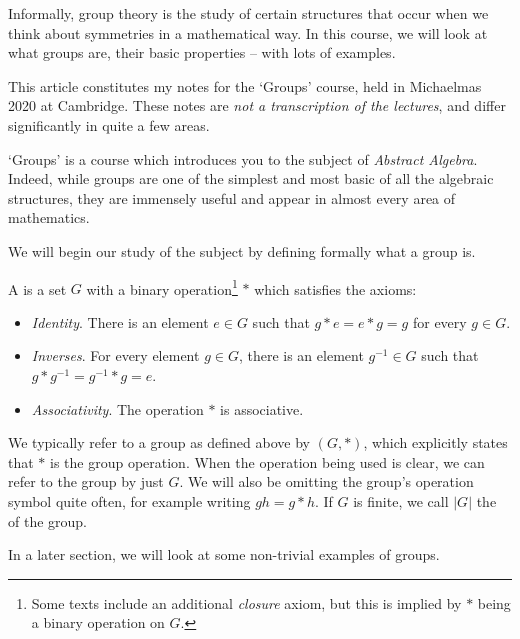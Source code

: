 



Informally, group theory is the study of certain structures that occur when we think about symmetries in a mathematical way.  In this course, we will look at what groups are, their basic properties -- with lots of examples.

This article constitutes my notes for the `Groups' course, held in Michaelmas 2020 at Cambridge. These notes are \emph{not a transcription of the lectures}, and differ significantly in quite a few areas.






`Groups' is a course which introduces you to the subject of \emph{Abstract Algebra}.
Indeed, while groups are one of the simplest and most basic of all the algebraic structures, they are immensely useful and appear in almost every area of mathematics. 


We will begin our study of the subject by defining formally what a group is.

\begin{definition}[Group]
	A  is a set $G$ with a binary operation\footnote{Some texts include an additional \emph{closure} axiom, but this is implied by $*$ being a binary operation on $G$.} $*$ which satisfies the axioms:
	\begin{itemize}
		\item \emph{Identity}. There is an element $e \in G$ such that $g * e = e * g = g$ for every $g \in G$.
		\item \emph{Inverses}. For every element $g \in G$, there is an element $g^{-1} \in G$ such that $g * g^{-1} = g^{-1} * g = e$.
		\item \emph{Associativity}. The operation $*$ is associative.
	\end{itemize}
\end{definition}

We typically refer to a group as defined above by $(G, *)$, which explicitly states that $*$ is the group operation. When the operation being used is clear, we can refer to the group by just $G$. We will also be omitting the group's operation symbol quite often, for example writing $gh = g * h$. If $G$ is finite, we call $|G|$ the  of the group.

In a later section, we will look at some non-trivial examples of groups.

